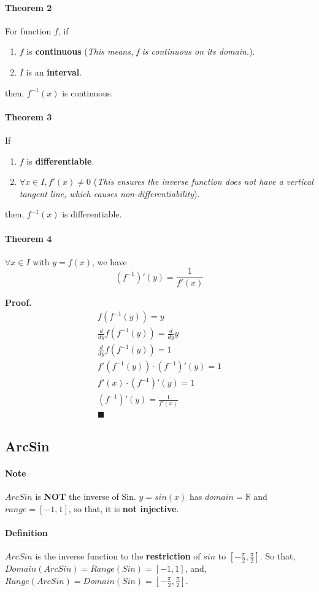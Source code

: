 \documentclass{article}
\begin{document}
	\paragraph{Theorem 2} For function $f$, if 
		\begin{enumerate}
			\item $f$ is \textbf{continuous} (\emph{This means, f is continuous on its domain.}).
			\item $I$ is an \textbf{interval}.
		\end{enumerate}
		then, $f^{-1}(x)$ is continuous.
	\paragraph{Theorem 3} If
		\begin{enumerate}
			\item $f$ is \textbf{differentiable}.
			\item $\forall x \in I, f'(x) \neq 0$ (\emph{This ensures the inverse function does not have a vertical tangent line, which causes non-differentiability}).
		\end{enumerate}
		then, $f^{-1}(x)$ is differentiable.
	\paragraph{Theorem 4} $\forall x \in I$ with $y=f(x)$, we have
	\[
	(f^{-1})'(y) = \frac{1}{f'(x)}
	\]

	\textbf{Proof.}
	\begin{align*}
		f(f^{-1}(y)) = y \\
		\frac{d}{dy} f(f^{-1}(y)) = \frac{d}{dy} y \\
		\frac{d}{dy} f(f^{-1}(y)) = 1 \\
		f'(f^{-1}(y)) \cdot (f^{-1})'(y) = 1 \\
		f'(x) \cdot (f^{-1})'(y) = 1 \\
		(f^{-1})'(y) = \frac{1}{f'(x)} \\
	\blacksquare
	\end{align*}
	\subsection{ArcSin}
	\paragraph{Note} $ArcSin$ is \textbf{NOT} the inverse of Sin. $y = sin(x)$ has $domain=\mathbb{R}$ and $range=[-1,1]$, so that, it is \textbf{not injective}.
	\paragraph{Definition} $ArcSin$ is the inverse function to the \textbf{restriction} of $sin$ to $[-\frac{\pi}{2} , \frac{\pi}{2}]$. So that, $Domain(ArcSin) = Range(Sin) = [-1,1]$, and, $Range(ArcSin) = Domain(Sin) = [-\frac{\pi}{2},\frac{\pi}{2}]$.
\end{document}
